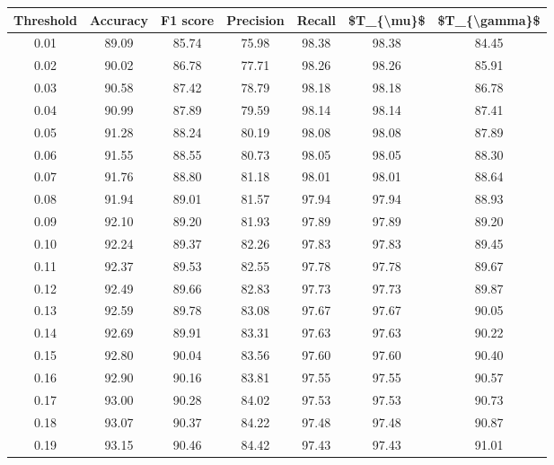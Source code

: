 \begin{tabular}{|c|c|c|c|c|c|c|}
\hline
 Threshold &  Accuracy &  F1 score &  Precision &  Recall &  \$T\_\{\textbackslash mu\}\$ &  \$T\_\{\textbackslash gamma\}\$ \\
\hline
      0.01 &     89.09 &     85.74 &      75.98 &   98.38 &      98.38 &         84.45 \\
      0.02 &     90.02 &     86.78 &      77.71 &   98.26 &      98.26 &         85.91 \\
      0.03 &     90.58 &     87.42 &      78.79 &   98.18 &      98.18 &         86.78 \\
      0.04 &     90.99 &     87.89 &      79.59 &   98.14 &      98.14 &         87.41 \\
      0.05 &     91.28 &     88.24 &      80.19 &   98.08 &      98.08 &         87.89 \\
      0.06 &     91.55 &     88.55 &      80.73 &   98.05 &      98.05 &         88.30 \\
      0.07 &     91.76 &     88.80 &      81.18 &   98.01 &      98.01 &         88.64 \\
      0.08 &     91.94 &     89.01 &      81.57 &   97.94 &      97.94 &         88.93 \\
      0.09 &     92.10 &     89.20 &      81.93 &   97.89 &      97.89 &         89.20 \\
      0.10 &     92.24 &     89.37 &      82.26 &   97.83 &      97.83 &         89.45 \\
      0.11 &     92.37 &     89.53 &      82.55 &   97.78 &      97.78 &         89.67 \\
      0.12 &     92.49 &     89.66 &      82.83 &   97.73 &      97.73 &         89.87 \\
      0.13 &     92.59 &     89.78 &      83.08 &   97.67 &      97.67 &         90.05 \\
      0.14 &     92.69 &     89.91 &      83.31 &   97.63 &      97.63 &         90.22 \\
      0.15 &     92.80 &     90.04 &      83.56 &   97.60 &      97.60 &         90.40 \\
      0.16 &     92.90 &     90.16 &      83.81 &   97.55 &      97.55 &         90.57 \\
      0.17 &     93.00 &     90.28 &      84.02 &   97.53 &      97.53 &         90.73 \\
      0.18 &     93.07 &     90.37 &      84.22 &   97.48 &      97.48 &         90.87 \\
      0.19 &     93.15 &     90.46 &      84.42 &   97.43 &      97.43 &         91.01 \\

\end{tabular}

